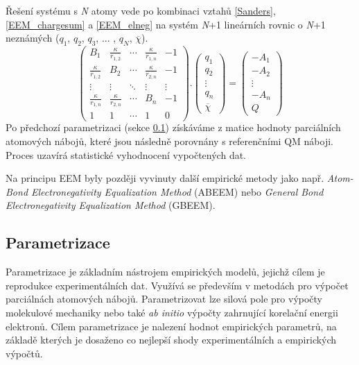 Řešení systému s \textit{N} atomy vede po kombinaci vztahů  \ref{Sanders}, \ref{EEM_chargesum} a \ref{EEM_elneg} na systém \textit{N}+1 lineárních rovnic o \textit{N}+1 neznámých ($q_1$, $q_2$, $q_3$, ... , $q_N$, $\overline{\chi}$).
\begin{equation}
\label{EEM_matrix}
 \begin{pmatrix}
  B_{1} & \frac{\kappa}{r_{1,2}} & \cdots & \frac{\kappa}{r_{1,n}} & -1\\
  \frac{\kappa}{r_{1,2}} & B_{2} & \cdots & \frac{\kappa}{r_{2,n}} & -1 \\
  \vdots  & \vdots  & \ddots & \vdots & \vdots  \\
  \frac{\kappa}{r_{1,n}} & \frac{\kappa}{r_{2,n}} & \cdots & B_{n} & -1 \\
  1 & 1 & \cdots & 1 & 0
 \end{pmatrix} .
 \begin{pmatrix}
 q_{1} \\ q_{2} \\ \vdots \\ q_{n} \\ \overline{\chi}
 \end{pmatrix} =
 \begin{pmatrix}
 -A_{1} \\ -A_{2} \\ \vdots \\ -A_{n} \\ Q
 \end{pmatrix}
\end{equation}
Po předchozí parametrizaci (sekce \ref{param}) získáváme z matice hodnoty parciálních atomových nábojů, které jsou následně porovnány s referenčními QM náboji. Proces uzavírá statistické vyhodnocení vypočtených dat.

Na principu EEM byly později vyvinuty další empirické metody jako např. \textit{Atom-Bond Electronegativity Equalization Method} (ABEEM) nebo \textit{General Bond Electronegativity Equalization Method} (GBEEM).

\subsection{Parametrizace}
\label{param}
Parametrizace je základním nástrojem empirických modelů, jejichž cílem je reproduk\-ce experimentálních dat. Využívá se především v metodách pro výpočet parciálnách atomových nábojů. Parametrizovat lze silová pole pro výpočty molekulové mechaniky nebo také \textit{ab initio} výpočty zahrnující korelační energii elektronů. Cílem parametrizace je nalezení hodnot empirických parametrů, na základě kterých je dosaženo co nejlepší shody experimentálních a empirických výpočtů. 

